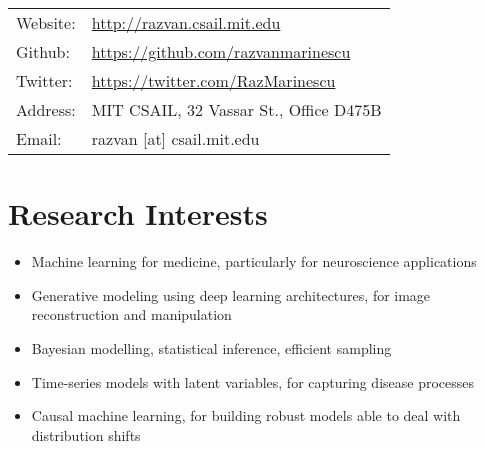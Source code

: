 \documentclass[a4paper,10pt]{article} %
\begin{document}
\pagestyle{empty} %



\par{\bigskip\par}

\begin{tabular}{ll}
 Website: & \url{http://razvan.csail.mit.edu}\\
 Github: & \url{https://github.com/razvanmarinescu}\\
 Twitter: & \url{https://twitter.com/RazMarinescu}\\
 Address: & MIT CSAIL, 32 Vassar St., Office D475B\\
 Email: & razvan [at] csail.mit.edu\\

\end{tabular}



\vspace{-0.5em}
\section*{Research Interests}
\begin{itemize}
\item Machine learning for medicine, particularly for neuroscience applications
\item Generative modeling using deep learning architectures, for image reconstruction and manipulation
\item Bayesian modelling, statistical inference, efficient sampling
\item Time-series models with latent variables, for capturing disease processes
\item Causal machine learning, for building robust models able to deal with distribution shifts
\end{itemize}
\end{document}
